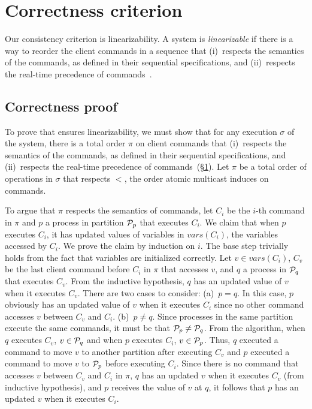 \section{Correctness criterion}
\label{sec:dynastar-correctcrit}

Our consistency criterion is linearizability.  A system is \emph{linearizable}
if there is a way to reorder the client commands in a sequence that (i)~respects
the semantics of the commands, as defined in their sequential specifications,
and (ii)~respects the real-time precedence of commands~\cite{Attiya04}.

\subsection{Correctness proof}
To prove that \dynastar ensures linearizability, we must show that for any
execution $\sigma$ of the system, there is a total order $\pi$ on client
commands that (i)~respects the semantics of the commands, as defined in their
sequential specifications, and (ii)~respects the real-time precedence of
commands~(\S\ref{sec:dynastar-correctcrit}).
%
Let $\pi$ be a total order of operations in $\sigma$ that respects $<$, the
order atomic multicast induces on commands.

To argue that $\pi$ respects the semantics of  commands, let $C_i$ be the $i$-th
command in $\pi$ and $p$ a process in partition $\mathcal{P}_p$ that executes $C_i$.
We claim that when $p$ executes $C_i$, it has updated values of variables in
$vars(C_i)$, the variables accessed by $C_i$. We prove the claim by induction on
$i$. The base step trivially holds from the fact that variables are initialized
correctly. Let $v \in vars(C_i)$, $C_v$ be the last client command before $C_i$
in $\pi$ that accesses $v$, and $q$ a process in $\mathcal{P}_q$ that executes $C_v$.
From the inductive hypothesis, $q$ has an updated value of $v$ when it executes
$C_v$. There are two cases to consider: (a)~$p = q$. In this case, $p$ obviously
has an updated value of $v$ when it executes $C_i$ since no other command
accesses $v$ between $C_v$ and $C_i$. (b)~$p \neq q$. Since processes in the
same partition execute the same commands, it must be that $\mathcal{P}_p \neq \mathcal{P}_q$.
From the algorithm, when $q$ executes $C_v$, $v \in \mathcal{P}_q$ and when $p$
executes $C_i$, $v \in \mathcal{P}_p$. Thus, $q$ executed a command to move $v$ to
another partition after executing $C_v$ and $p$ executed a command to move $v$
to $\mathcal{P}_p$ before executing $C_i$. Since there is no command that accesses $v$
between $C_v$ and $C_i$ in $\pi$, $q$ has an updated $v$ when it executes $C_v$
(from inductive hypothesis), and $p$ receives the value of $v$ at $q$, it
follows that $p$ has an updated $v$ when it executes $C_i$.

